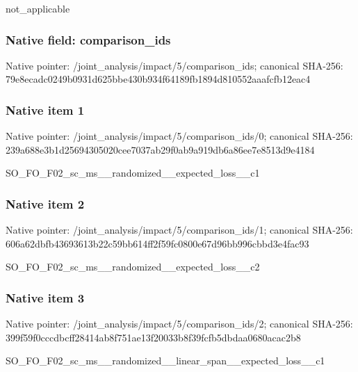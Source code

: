 \documentclass[10pt,a4paper]{article}
\begin{document}
\begingroup\raggedright\sloppy not\_\allowbreak{}applicable\par\endgroup

\subsubsection{Native field: comparison\_\allowbreak{}ids}
Native pointer: /joint\_\allowbreak{}analysis/impact/5/comparison\_\allowbreak{}ids; canonical SHA-256: 79e8ecadc0249b0931d625bbe430b934f64189fb1894d810552aaafcfb12eac4

\subsubsection{Native item 1}
Native pointer: /joint\_\allowbreak{}analysis/impact/5/comparison\_\allowbreak{}ids/0; canonical SHA-256: 239a688e3b1d25694305020cee7037ab29f0ab9a919db6a86ee7e8513d9e4184

\begingroup\raggedright\sloppy SO\_\allowbreak{}FO\_\allowbreak{}F02\_\allowbreak{}sc\_\allowbreak{}ms\_\allowbreak{}\_\allowbreak{}randomized\_\allowbreak{}\_\allowbreak{}expected\_\allowbreak{}loss\_\allowbreak{}\_\allowbreak{}c1\par\endgroup

\subsubsection{Native item 2}
Native pointer: /joint\_\allowbreak{}analysis/impact/5/comparison\_\allowbreak{}ids/1; canonical SHA-256: 606a62dbfb43693613b22c59bb614ff2f59fc0800e67d96bb996cbbd3e4fac93

\begingroup\raggedright\sloppy SO\_\allowbreak{}FO\_\allowbreak{}F02\_\allowbreak{}sc\_\allowbreak{}ms\_\allowbreak{}\_\allowbreak{}randomized\_\allowbreak{}\_\allowbreak{}expected\_\allowbreak{}loss\_\allowbreak{}\_\allowbreak{}c2\par\endgroup

\subsubsection{Native item 3}
Native pointer: /joint\_\allowbreak{}analysis/impact/5/comparison\_\allowbreak{}ids/2; canonical SHA-256: 399f59f0cccdbcff28414ab8f751ae13f20033b8f39fcfb5dbdaa0680acac2b8

\begingroup\raggedright\sloppy SO\_\allowbreak{}FO\_\allowbreak{}F02\_\allowbreak{}sc\_\allowbreak{}ms\_\allowbreak{}\_\allowbreak{}randomized\_\allowbreak{}\_\allowbreak{}linear\_\allowbreak{}span\_\allowbreak{}\_\allowbreak{}expected\_\allowbreak{}loss\_\allowbreak{}\_\allowbreak{}c1\par\endgroup
\end{document}
